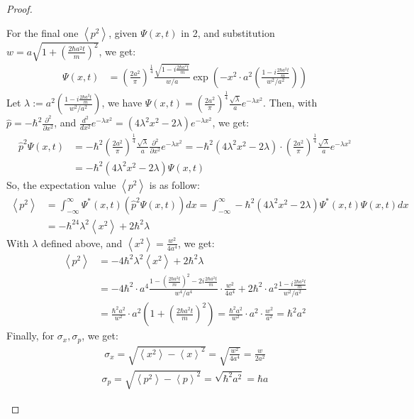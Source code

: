 \documentclass{article}
\begin{document}
\begin{proof}
\begin{itemize}
        For the final one $\left<p^2\right>$, given $\Psi(x,t)$ in 2, and substitution $w=a\sqrt{1+\left(\frac{2\hbar a^2t}{m}\right)^2}$, we get:
        \begin{align}
            \Psi(x,t) &= \left(\frac{2a^2}{\pi}\right)^\frac{1}{4}\frac{\sqrt{1-i\frac{2\hbar a^2t}{m}}}{w/a}\exp\left(-x^2\cdot a^2\left(\frac{1-i\frac{2\hbar a^2t}{m}}{w^2/a^2}\right)\right)
        \end{align}
        Let $\lambda:= a^2\left(\frac{1-i\frac{2\hbar a^2t}{m}}{w^2/a^2}\right)$, we have  $\Psi(x,t) = \left(\frac{2a^2}{\pi}\right)^\frac{1}{4}\frac{\sqrt{\lambda}}{a}e^{-\lambda x^2}$. Then, with $\hat{p}=-\hbar^2\frac{\partial^2}{\partial x^2}$, and $\frac{d^2}{dx^2}e^{-\lambda x^2} = (4\lambda^2x^2 - 2\lambda)e^{-\lambda x^2}$, we get:
        \begin{align}
            \hat{p}^2 \Psi(x,t) &= -\hbar^2 \left(\frac{2a^2}{\pi}\right)^\frac{1}{4}\frac{\sqrt{\lambda}}{a}\frac{\partial^2}{\partial x^2}e^{-\lambda x^2} = -\hbar^2(4\lambda^2x^2-2\lambda)\cdot\left(\frac{2a^2}{\pi}\right)^\frac{1}{4}\frac{\sqrt{\lambda}}{a}e^{-\lambda x^2}\\
            &= -\hbar^2(4\lambda^2 x^2-2\lambda)\Psi(x,t)
        \end{align}
        So, the expectation value $\left<p^2\right>$ is as follow:
        \begin{align}
            \left<p^2\right>&= \int_{-\infty}^{\infty}\Psi^*(x,t)\left(\hat{p}^2\Psi(x,t)\right)dx = \int_{-\infty}^{\infty}-\hbar^2(4\lambda^2x^2 - 2\lambda)\Psi^*(x,t)\Psi(x,t)dx\\
            &= -\hbar^24\lambda^2\left<x^2\right> + 2\hbar^2\lambda
        \end{align}
        With $\lambda$ defined above, and $\left<x^2\right> = \frac{w^2}{4a^4}$, we get:
        \begin{align}
            \left<p^2\right>&=-4\hbar^2\lambda^2\left<x^2\right> + 2\hbar^2\lambda\\
            &= -4\hbar^2\cdot a^4\frac{1-\left(\frac{2\hbar a^2t}{m}\right)^2 - 2i\frac{2\hbar a^2t}{m}}{w^4/a^4}\cdot\frac{w^2}{4a^4} + 2\hbar^2 \cdot a^2\frac{1-i\frac{2\hbar a^2t}{m}}{w^2/a^2}\\
            &= \frac{\hbar^2a^2}{w^2}\cdot a^2\left(1+\left(\frac{2\hbar a^2t}{m}\right)^2\right) = \frac{\hbar^2a^2}{w^2}\cdot a^2\cdot\frac{w^2}{a^2} = \hbar^2a^2
        \end{align}
        Finally, for $\sigma_x,\sigma_p$, we get:
        \begin{align}
            \sigma_x = \sqrt{\left<x^2\right>-\left<x\right>^2} = \sqrt{\frac{w^2}{4a^4}} = \frac{w}{2a^2}
        \end{align}
        \begin{align}
            \sigma_p = \sqrt{\left<p^2\right>-\left<p\right>^2}=\sqrt{\hbar^2a^2} = \hbar a
        \end{align}


\end{itemize}
\end{proof}
\end{document}
